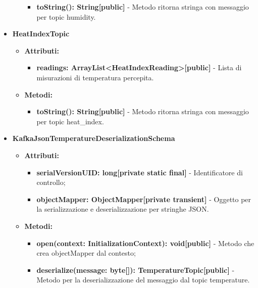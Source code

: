 \documentclass[8pt]{article}
\begin{document}
\begin{itemize}
\begin{itemize}
        \begin{itemize}
            \item \textbf{toString(): String[public]} - Metodo ritorna stringa con messaggio per topic humidity.
        \end{itemize}
    \end{itemize}
    \item \textbf{HeatIndexTopic}
    \begin{itemize}
        \item \textbf{Attributi:}
        \begin{itemize}
            \item \textbf{readings: ArrayList<HeatIndexReading>[public]} - Lista di misurazioni di temperatura percepita.
        \end{itemize}
    \end{itemize}
    \begin{itemize}
        \item \textbf{Metodi:}
        \begin{itemize}
            \item \textbf{toString(): String[public]} - Metodo ritorna stringa con messaggio per topic heat\_index.
        \end{itemize}
    \end{itemize}
    \item \textbf{KafkaJsonTemperatureDeserializationSchema}
    \begin{itemize}
        \item \textbf{Attributi:}
        \begin{itemize}
            \item \textbf{serialVersionUID: long[private static final]} - Identificatore di controllo;
            \item \textbf{objectMapper: ObjectMapper[private transient]} - Oggetto per la serializzazione e deserializzazione per stringhe JSON.
        \end{itemize}
    \end{itemize}
    \begin{itemize}
        \item \textbf{Metodi:}
        \begin{itemize}
            \item \textbf{open(context: InitializationContext): void[public]} - Metodo che crea objectMapper dal contesto;
            \item \textbf{deserialize(message: byte[]): TemperatureTopic[public]} - Metodo per la deserializzazione del messaggio dal topic temperature.

\end{itemize}
\end{itemize}
\end{itemize}
\end{document}
